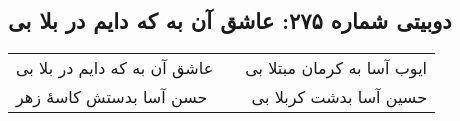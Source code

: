 \begin{center}
\section*{دوبیتی شماره ۲۷۵: عاشق آن به که دایم در بلا بی}
\label{sec:275}
\begin{longtable}{l p{0.5cm} r}
عاشق آن به که دایم در بلا بی
&&
ایوب آسا به کرمان مبتلا بی
\\
حسن آسا بدستش کاسهٔ زهر
&&
حسین آسا بدشت کربلا بی
\\
\end{longtable}
\end{center}
